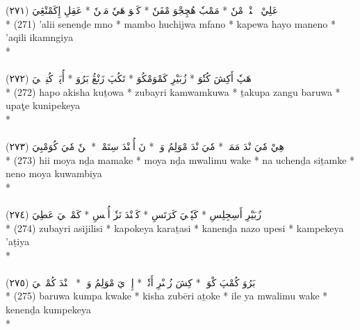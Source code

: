 \documentclass[a4paper, 12pt]{report}
\begin{document}
\begin{center}
\textarabic{(٢٧١) \textcolor{mygreen}{عَلِيْ سٖنٖنْدٖ مْنٗ  * مَمْبٗ هُچِجْوَ مْفَنٗ  * كَپٖوَ هَيٗ مَنٖنٗ  * عَقِلِ إِكَمْنْڠِيَ }} \\* 
(271) 'alii senenḏe mno  * mambo huchijwa mfano  * kapewa hayo maneno  * 'aqili ikamngiya  \\* 
 \\ 
\\[8mm] 

\textarabic{(٢٧٢) \textcolor{mygreen}{هَپٗ أَكِشَ كُتٗوَ  * زُبَيْرِ كَمْوَمْكُوَ  * تَكُپَ زَنْڠُ بَرُوَ  * أُپَٹٖ كُنِپٖكٖيَ }} \\* 
(272) hapo akisha kuṯowa  * zubayri kamwamkuwa  * ṯakupa zangu baruwa  * upaţe kunipekeya  \\* 
 \\ 
\\[8mm] 

\textarabic{(٢٧٣) \textcolor{mygreen}{هِيْ مٗيَ نْدَ مَمَكٖ  * مٗيَ نْدَ مْوَلِمُ وَكٖ  * نَ أُچٖنْدَ سِتَمْكٖ  * نٖنٗ مٗيَ كُوَمْبِيَ }} \\* 
(273) hii moya nḏa mamake  * moya nḏa mwalimu wake  * na uchenḏa siṯamke  * neno moya kuwambiya  \\* 
 \\ 
\\[8mm] 

\textarabic{(٢٧٤) \textcolor{mygreen}{زُبَيْرِ أَسِجِلِسِ  * كَپٗكٖيَ كَرَتَسِ  * كَنٖنْدَ نَزٗ أُپٖسِ  * كَمْپٖكٖيَ عَطِيَ }} \\* 
(274) zubayri asijilisi  * kapokeya karaṯasi  * kanenḏa nazo upesi  * kampekeya 'aṭiya  \\* 
 \\ 
\\[8mm] 

\textarabic{(٢٧٥) \textcolor{mygreen}{بَرُوَ كُمْپَ كْوَكٖ  * كِشَ زُبٖىْرِ أَتٗكٖ  * إِلٖ يَ مْوَلِمُ وَكٖ  * كٖنٖنْدَ كُمْپٖكٖيَ }} \\* 
(275) baruwa kumpa kwake  * kisha zubēri aṯoke  * ile ya mwalimu wake  * kenenḏa kumpekeya  \\* 
 \\ 
\\[8mm] 


\end{center}
\end{document}
